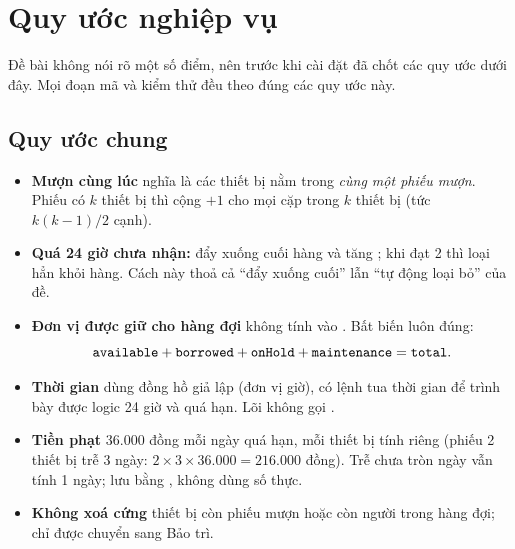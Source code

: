 \chapter{Quy ước nghiệp vụ}

Đề bài không nói rõ một số điểm, nên trước khi cài đặt đã chốt các quy ước dưới đây. Mọi đoạn mã và kiểm thử đều theo đúng các quy ước này.

\section{Quy ước chung}
\begin{itemize}
  \item \textbf{Mượn cùng lúc} nghĩa là các thiết bị nằm trong \emph{cùng một phiếu mượn}. Phiếu có $k$ thiết bị thì cộng $+1$ cho mọi cặp trong $k$ thiết bị (tức $k(k-1)/2$ cạnh).
  \item \textbf{Quá 24 giờ chưa nhận:} đẩy xuống cuối hàng và tăng ; khi  đạt 2 thì loại hẳn khỏi hàng. Cách này thoả cả ``đẩy xuống cuối'' lẫn ``tự động loại bỏ'' của đề.
  \item \textbf{Đơn vị được giữ cho hàng đợi} không tính vào . Bất biến luôn đúng:
  \[\code{available} + \code{borrowed} + \code{onHold} + \code{maintenance} = \code{total}.\]
  \item \textbf{Thời gian} dùng đồng hồ giả lập  (đơn vị giờ), có lệnh tua thời gian để trình bày được logic 24 giờ và quá hạn. Lõi không gọi .
  \item \textbf{Tiền phạt} 36.000 đồng mỗi ngày quá hạn, mỗi thiết bị tính riêng (phiếu 2 thiết bị trễ 3 ngày: $2\times 3\times 36.000 = 216.000$ đồng). Trễ chưa tròn ngày vẫn tính 1 ngày; lưu bằng , không dùng số thực.
  \item \textbf{Không xoá cứng} thiết bị còn phiếu mượn hoặc còn người trong hàng đợi; chỉ được chuyển sang Bảo trì.
\end{itemize}

